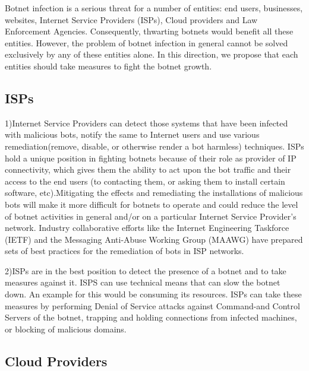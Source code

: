 \label{cap:sec1}


Botnet infection is a serious threat for a number of entities: end users, businesses, websites, Internet Service Providers (ISPs), Cloud providers and Law Enforcement Agencies. Consequently, thwarting botnets would benefit all these entities. However, the problem of botnet infection in general cannot be solved exclusively by any of these entities alone. In this direction, we propose that each entities should take measures to fight the botnet growth.

\subsection{ISPs}

1)Internet Service Providers can detect those systems that have been infected with malicious bots, notify the same to Internet users and use various remediation(remove, disable, or otherwise render a bot harmless) techniques. ISPs hold a unique position in fighting botnets because of  their role as provider of IP connectivity, which gives them the ability to act upon the bot traffic and their access to the end users (to contacting them, or asking them to install certain software, etc).Mitigating the effects and remediating the installations of malicious bots will make it more difficult for botnets to operate and could reduce the level of botnet activities in general and/or on a particular Internet Service Provider's network. Industry collaborative efforts like the Internet Engineering Taskforce (IETF) and the Messaging Anti-Abuse Working Group (MAAWG) have prepared sets of best practices for the remediation of bots in ISP networks.  

2)ISPs are in the best position to detect the presence of a botnet and to take measures against it. ISPS can use technical means that can slow the botnet down. An example for this would be consuming its resources. ISPs can take these measures by performing Denial of Service attacks against Command-and Control Servers of the botnet, trapping and holding connections from infected machines, or blocking of malicious domains.

\subsection{Cloud Providers}

